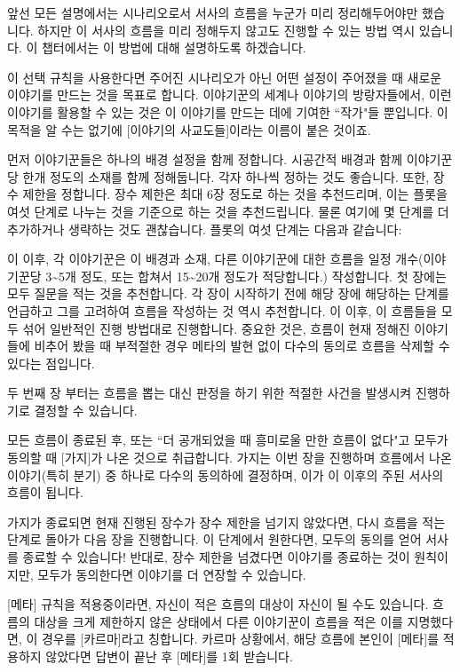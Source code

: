 \documentclass{report}
\begin{document}
	앞선 모든 설명에서는 시나리오로서 서사의 흐름을 누군가 미리 정리해두어야만 했습니다. 하지만 이 서사의 흐름을 미리 정해두지 않고도 진행할 수 있는 방법 역시 있습니다. 이 챕터에서는 이 방법에 대해 설명하도록 하겠습니다.
	
	이 선택 규칙을 사용한다면 주어진 시나리오가 아닌 어떤 설정이 주어졌을 때 새로운 이야기를 만드는 것을 목표로 합니다. 이야기꾼의 세계나 이야기의 방랑자들에서, 이런 이야기를 활용할 수 있는 것은 이 이야기를 만드는 데에 기여한 ``작가"들 뿐입니다. 이 목적을 알 수는 없기에 [이야기의 사교도들]이라는 이름이 붙은 것이죠.
	
	먼저 이야기꾼들은 하나의 배경 설정을 함께 정합니다. 시공간적 배경과 함께 이야기꾼당 한개 정도의 소재를 함께 정해둡니다. 각자 하나씩 정하는 것도 좋습니다. 또한, 장수 제한을 정합니다. 장수 제한은 최대 6장 정도로 하는 것을 추천드리며, 이는 플롯을 여섯 단계로 나누는 것을 기준으로 하는 것을 추천드립니다. 물론 여기에 몇 단계를 더 추가하거나 생략하는 것도 괜찮습니다. 플롯의 여섯 단계는 다음과 같습니다:
	
	\medskip
	
	\noindent{}
	
	\medskip
	
	이 이후, 각 이야기꾼은 이 배경과 소재, 다른 이야기꾼에 대한 흐름을 일정 개수(이야기꾼당 3\textasciitilde 5개 정도, 또는 합쳐서 15\textasciitilde20개 정도가 적당합니다.) 작성합니다. 첫 장에는 모두 질문을 적는 것을 추천합니다. 각 장이 시작하기 전에 해당 장에 해당하는 단계를 언급하고 그를 고려하여 흐름을 작성하는 것 역시 추천합니다. 이 이후, 이 흐름들을 모두 섞어 일반적인 진행 방법대로 진행합니다. 중요한 것은, 흐름이 현재 정해진 이야기들에 비추어 봤을 때 부적절한 경우 메타의 발현 없이 다수의 동의로 흐름을 삭제할 수 있다는 점입니다.
	
	두 번째 장 부터는 흐름을 뽑는 대신 판정을 하기 위한 적절한 사건을 발생시켜 진행하기로 결정할 수 있습니다.
	
	모든 흐름이 종료된 후,  또는 ``더 공개되었을 때 흥미로울 만한 흐름이 없다"고 모두가 동의할 때 [가지]가 나온 것으로 취급합니다. 가지는 이번 장을 진행하며 흐름에서 나온 이야기(특히 분기) 중 하나로 다수의 동의하에 결정하며, 이가 이 이후의 주된 서사의 흐름이 됩니다.
	
	가지가 종료되면 현재 진행된 장수가 장수 제한을 넘기지 않았다면, 다시 흐름을 적는 단계로 돌아가 다음 장을 진행합니다. 이 단계에서 원한다면, 모두의 동의를 얻어 서사를 종료할 수 있습니다! 반대로, 장수 제한을 넘겼다면 이야기를 종료하는 것이 원칙이지만, 모두가 동의한다면 이야기를 더 연장할 수 있습니다.
	
	\medskip
	
	[메타] 규칙을 적용중이라면, 자신이 적은 흐름의 대상이 자신이 될 수도 있습니다. 흐름의 대상을 크게 제한하지 않은 상태에서 다른 이야기꾼이 흐름을 적은 이를 지명했다면, 이 경우를 [카르마]라고 칭합니다. 카르마 상황에서, 해당 흐름에 본인이 [메타]를 적용하지 않았다면 답변이 끝난 후 [메타]를 1회 받습니다.
\end{document}
